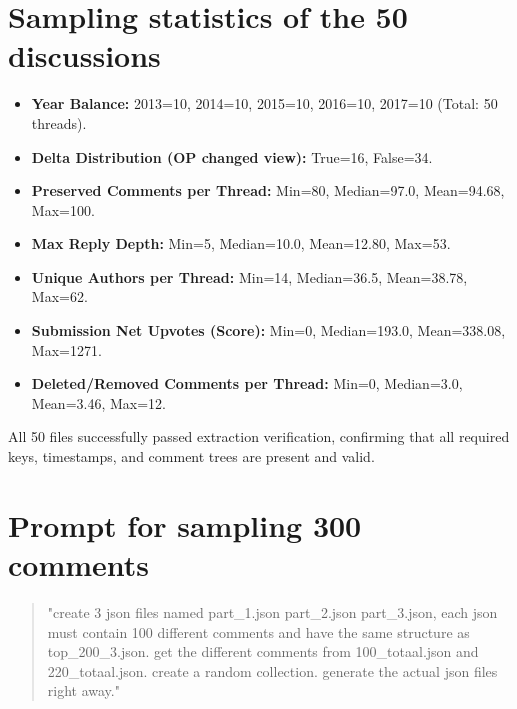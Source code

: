\documentclass[
10pt, %
a4paper, %
oneside, %
headinclude,footinclude, %
] {book}%
\begin{document}
\section{Sampling statistics of the 50 discussions}
\label{sec:dataset_stats}
\begin{tcolorbox}[
    colback=gray!5,
    colframe=black!75,
    title=The 50 selected ChangeMyView threads from the Webis-CMV-20 corpus (generated on 2026-04-07) contain the following overall characteristics:,
    sharp corners,
    boxrule=0.5pt
]


\begin{itemize}
    \item \textbf{Year Balance:} 2013=10, 2014=10, 2015=10, 2016=10, 2017=10 (Total: 50 threads).
    \item \textbf{Delta Distribution (OP changed view):} True=16, False=34.
    \item \textbf{Preserved Comments per Thread:} Min=80, Median=97.0, Mean=94.68, Max=100.
    \item \textbf{Max Reply Depth:} Min=5, Median=10.0, Mean=12.80, Max=53.
    \item \textbf{Unique Authors per Thread:} Min=14, Median=36.5, Mean=38.78, Max=62.
    \item \textbf{Submission Net Upvotes (Score):} Min=0, Median=193.0, Mean=338.08, Max=1271.
    \item \textbf{Deleted/Removed Comments per Thread:} Min=0, Median=3.0, Mean=3.46, Max=12.
\end{itemize}
All 50 files successfully passed extraction verification, confirming that all required keys, timestamps, and comment trees are present and valid.

\end{tcolorbox}

\section{Prompt for sampling 300 comments}
\label{sec:sampling_prompt}
\begin{quote}
\small\ttfamily
"create 3 json files named part\_1.json part\_2.json part\_3.json, each json must contain 100 different comments and have the same structure as top\_200\_3.json. get the different comments from 100\_totaal.json and 220\_totaal.json. create a random collection. generate the actual json files right away."\\
\end{quote}
\end{document}

